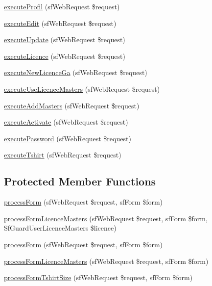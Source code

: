 \begin{DoxyCompactItemize}
\hyperlink{classuser_actions_a4689fdc44594daa28a9134d3f508a19c}{execute\-Profil} (sf\-Web\-Request \$request)
\item 
\hyperlink{classuser_actions_af4d8fedd4b28f3398826a1bb8fa54394}{execute\-Edit} (sf\-Web\-Request \$request)
\item 
\hyperlink{classuser_actions_af7b4f51862add3c2ebb54efc136a0840}{execute\-Update} (sf\-Web\-Request \$request)
\item 
\hyperlink{classuser_actions_a95833debb9cf1b5d1f4ba88a9fa45791}{execute\-Licence} (sf\-Web\-Request \$request)
\item 
\hyperlink{classuser_actions_a07ef9245b4b6e2d578eb977606861557}{execute\-New\-Licence\-Ga} (sf\-Web\-Request \$request)
\item 
\hyperlink{classuser_actions_ac5316ea0075817f44dbc00853e0c9343}{execute\-Use\-Licence\-Masters} (sf\-Web\-Request \$request)
\item 
\hyperlink{classuser_actions_ae474601a15cd459ef9eee108ab417f53}{execute\-Add\-Masters} (sf\-Web\-Request \$request)
\item 
\hyperlink{classuser_actions_a4e5f156d441fdc5fc9e594cd905f908a}{execute\-Activate} (sf\-Web\-Request \$request)
\item 
\hyperlink{classuser_actions_a0e83060f91f754396aa387afc64b2205}{execute\-Password} (sf\-Web\-Request \$request)
\item 
\hyperlink{classuser_actions_ad36bec308b42a73a066e18de84e26971}{execute\-Tshirt} (sf\-Web\-Request \$request)
\end{DoxyCompactItemize}
\subsection*{Protected Member Functions}
\begin{DoxyCompactItemize}
\item 
\hyperlink{classuser_actions_a7cf661d837626e0320753cbffa019a01}{process\-Form} (sf\-Web\-Request \$request, sf\-Form \$form)
\item 
\hyperlink{classuser_actions_af2669f70ff53eceb031b85247ad9d157}{process\-Form\-Licence\-Masters} (sf\-Web\-Request \$request, sf\-Form \$form, Sf\-Guard\-User\-Licence\-Masters \$licence)
\item 
\hyperlink{classuser_actions_a7cf661d837626e0320753cbffa019a01}{process\-Form} (sf\-Web\-Request \$request, sf\-Form \$form)
\item 
\hyperlink{classuser_actions_a3dfe1fae1762bbc2bb86057ea236a35d}{process\-Form\-Licence\-Masters} (sf\-Web\-Request \$request, sf\-Form \$form)
\item 
\hyperlink{classuser_actions_a91444c95d24417c40e0b198841b466d1}{process\-Form\-Tshirt\-Size} (sf\-Web\-Request \$request, sf\-Form \$form)
\end{DoxyCompactItemize}


